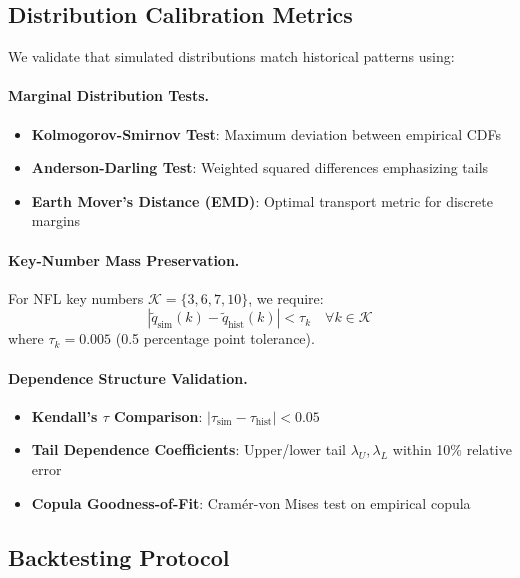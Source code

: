 \subsection{Distribution Calibration Metrics}

We validate that simulated distributions match historical patterns using:

\paragraph{Marginal Distribution Tests.}
\begin{itemize}
  \item \textbf{Kolmogorov-Smirnov Test}: Maximum deviation between empirical CDFs
  \item \textbf{Anderson-Darling Test}: Weighted squared differences emphasizing tails
  \item \textbf{Earth Mover's Distance (EMD)}: Optimal transport metric for discrete margins
\end{itemize}

\paragraph{Key-Number Mass Preservation.}
For NFL key numbers $\mathcal{K} = \{3, 6, 7, 10\}$, we require:
\[
|\tilde{q}_{\text{sim}}(k) - \tilde{q}_{\text{hist}}(k)| < \tau_k \quad \forall k \in \mathcal{K}
\]
where $\tau_k = 0.005$ (0.5 percentage point tolerance).

\paragraph{Dependence Structure Validation.}
\begin{itemize}
  \item \textbf{Kendall's $\tau$ Comparison}: $|\tau_{\text{sim}} - \tau_{\text{hist}}| < 0.05$
  \item \textbf{Tail Dependence Coefficients}: Upper/lower tail $\lambda_U, \lambda_L$ within 10\% relative error
  \item \textbf{Copula Goodness-of-Fit}: Cramér-von Mises test on empirical copula
\end{itemize}

\subsection{Backtesting Protocol}

